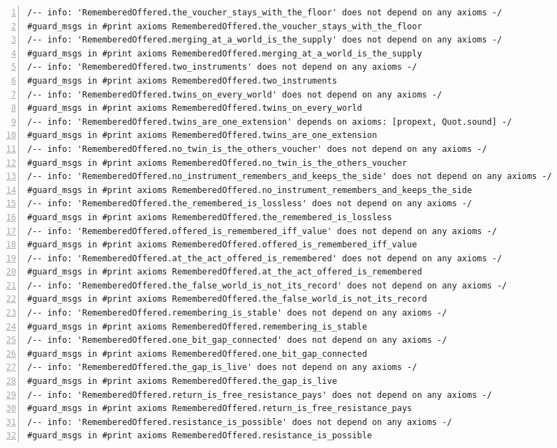 \documentclass[10pt]{article}
\newcommand{\leansize}{\fontsize{5.5pt}{6.75pt}\selectfont}
\begin{document}
\begin{multicols}{2}
\begin{Verbatim}[numbers=left,firstnumber=1,numbersep=3pt,xleftmargin=2.6em,breaklines=true,breakanywhere=true,breakautoindent=false,breakindent=1.4em,breaksymbolleft={},breakanywheresymbolpre={},fontsize=\leansize]
/-- info: 'RememberedOffered.the_voucher_stays_with_the_floor' does not depend on any axioms -/
#guard_msgs in #print axioms RememberedOffered.the_voucher_stays_with_the_floor
/-- info: 'RememberedOffered.merging_at_a_world_is_the_supply' does not depend on any axioms -/
#guard_msgs in #print axioms RememberedOffered.merging_at_a_world_is_the_supply
/-- info: 'RememberedOffered.two_instruments' does not depend on any axioms -/
#guard_msgs in #print axioms RememberedOffered.two_instruments
/-- info: 'RememberedOffered.twins_on_every_world' does not depend on any axioms -/
#guard_msgs in #print axioms RememberedOffered.twins_on_every_world
/-- info: 'RememberedOffered.twins_are_one_extension' depends on axioms: [propext, Quot.sound] -/
#guard_msgs in #print axioms RememberedOffered.twins_are_one_extension
/-- info: 'RememberedOffered.no_twin_is_the_others_voucher' does not depend on any axioms -/
#guard_msgs in #print axioms RememberedOffered.no_twin_is_the_others_voucher
/-- info: 'RememberedOffered.no_instrument_remembers_and_keeps_the_side' does not depend on any axioms -/
#guard_msgs in #print axioms RememberedOffered.no_instrument_remembers_and_keeps_the_side
/-- info: 'RememberedOffered.the_remembered_is_lossless' does not depend on any axioms -/
#guard_msgs in #print axioms RememberedOffered.the_remembered_is_lossless
/-- info: 'RememberedOffered.offered_is_remembered_iff_value' does not depend on any axioms -/
#guard_msgs in #print axioms RememberedOffered.offered_is_remembered_iff_value
/-- info: 'RememberedOffered.at_the_act_offered_is_remembered' does not depend on any axioms -/
#guard_msgs in #print axioms RememberedOffered.at_the_act_offered_is_remembered
/-- info: 'RememberedOffered.the_false_world_is_not_its_record' does not depend on any axioms -/
#guard_msgs in #print axioms RememberedOffered.the_false_world_is_not_its_record
/-- info: 'RememberedOffered.remembering_is_stable' does not depend on any axioms -/
#guard_msgs in #print axioms RememberedOffered.remembering_is_stable
/-- info: 'RememberedOffered.one_bit_gap_connected' does not depend on any axioms -/
#guard_msgs in #print axioms RememberedOffered.one_bit_gap_connected
/-- info: 'RememberedOffered.the_gap_is_live' does not depend on any axioms -/
#guard_msgs in #print axioms RememberedOffered.the_gap_is_live
/-- info: 'RememberedOffered.return_is_free_resistance_pays' does not depend on any axioms -/
#guard_msgs in #print axioms RememberedOffered.return_is_free_resistance_pays
/-- info: 'RememberedOffered.resistance_is_possible' does not depend on any axioms -/
#guard_msgs in #print axioms RememberedOffered.resistance_is_possible

\end{Verbatim}
\end{multicols}
\end{document}

